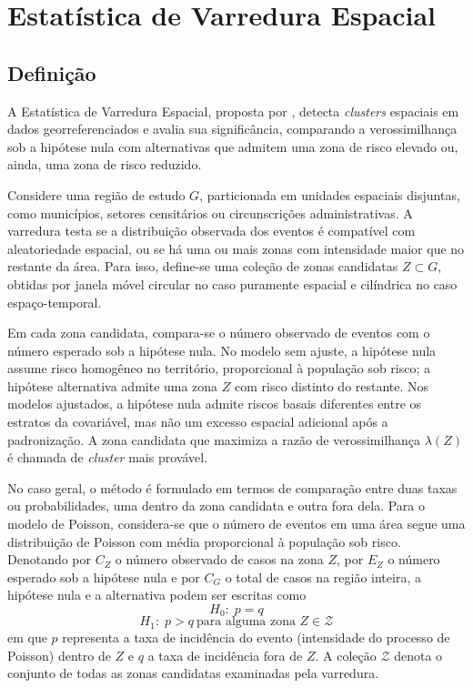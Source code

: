 \section{Estatística de Varredura Espacial}
\label{sec:scan}

\subsection{Definição}

A Estatística de Varredura Espacial, proposta por , detecta \textit{clusters} espaciais em dados georreferenciados e avalia sua significância, comparando a verossimilhança sob a hipótese nula com alternativas que admitem uma zona de risco elevado ou, ainda, uma zona de risco reduzido.

Considere uma região de estudo \(G\), particionada em unidades espaciais disjuntas, como municípios, setores censitários ou circunscrições administrativas. A varredura testa se a distribuição observada dos eventos é compatível com aleatoriedade espacial, ou se há uma ou mais zonas com intensidade maior que no restante da área. Para isso, define-se uma coleção de zonas candidatas \(Z \subset G\), obtidas por janela móvel circular no caso puramente espacial e cilíndrica no caso espaço-temporal.

Em cada zona candidata, compara-se o número observado de eventos com o número esperado sob a hipótese nula. No modelo sem ajuste, a hipótese nula assume risco homogêneo no território, proporcional à população sob risco; a hipótese alternativa admite uma zona \(Z\) com risco distinto do restante. Nos modelos ajustados, a hipótese nula admite riscos basais diferentes entre os estratos da covariável, mas não um excesso espacial adicional após a padronização. A zona candidata que maximiza a razão de verossimilhança \(\lambda(Z)\) é chamada de \textit{cluster} mais provável.

No caso geral, o método é formulado em termos de comparação entre duas taxas ou probabilidades, uma dentro da zona candidata e outra fora dela. Para o modelo de Poisson, considera-se que o número de eventos em uma área segue uma distribuição de Poisson com média proporcional à população sob risco. Denotando por \(C_Z\) o número observado de casos na zona \(Z\), por \(E_Z\) o número esperado sob a hipótese nula e por \(C_G\) o total de casos na região inteira, a hipótese nula e a alternativa podem ser escritas como
\begin{equation*}
H_0:\; p=q
\label{eq:h0_scan}
\end{equation*}
\begin{equation*}
H_1:\; p>q \ \text{para alguma zona } Z \in \mathcal{Z}
\label{eq:h1_scan}
\end{equation*}
em que \(p\) representa a taxa de incidência do evento (intensidade do processo de Poisson) dentro de \(Z\) e \(q\) a taxa de incidência fora de \(Z\). A coleção \(\mathcal{Z}\) denota o conjunto de todas as zonas candidatas examinadas pela varredura.


